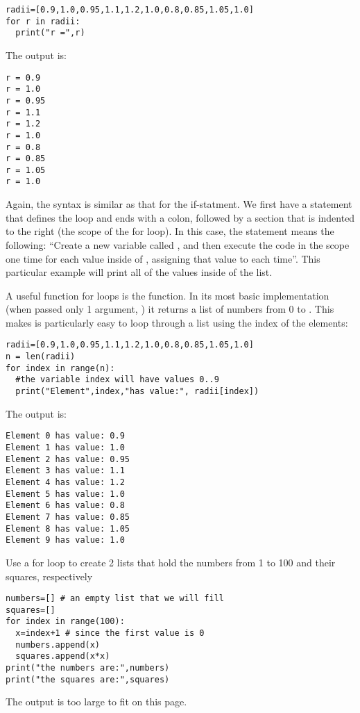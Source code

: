 \begin{lstlisting}[frame=single] 
radii=[0.9,1.0,0.95,1.1,1.2,1.0,0.8,0.85,1.05,1.0]
for r in radii:
  print("r =",r)
\end{lstlisting}
The output is:
\begin{verbatim}
r = 0.9
r = 1.0
r = 0.95
r = 1.1
r = 1.2
r = 1.0
r = 0.8
r = 0.85
r = 1.05
r = 1.0
\end{verbatim}

Again, the syntax is similar as that for the if-statment. We first have a statement that defines the loop and ends with a colon, followed by a section that is indented to the right (the scope of the for loop). In this case, the  statement means the following: ``Create a new variable called , and then execute the code in the scope one time for each value inside of , assigning that value to  each time''. This particular example will print all of the values inside of the list.

A useful function for loops is the  function. In its most basic implementation (when passed only 1 argument, ) it returns a list of numbers from 0 to . This makes is particularly easy to loop through a list using the index of the elements:

\begin{lstlisting}[frame=single] 
radii=[0.9,1.0,0.95,1.1,1.2,1.0,0.8,0.85,1.05,1.0]
n = len(radii)
for index in range(n):
  #the variable index will have values 0..9
  print("Element",index,"has value:", radii[index])
\end{lstlisting}
The output is:
\begin{verbatim}
Element 0 has value: 0.9
Element 1 has value: 1.0
Element 2 has value: 0.95
Element 3 has value: 1.1
Element 4 has value: 1.2
Element 5 has value: 1.0
Element 6 has value: 0.8
Element 7 has value: 0.85
Element 8 has value: 1.05
Element 9 has value: 1.0
\end{verbatim}

\begin{example}{0pt}{Use a for loop to create 2 lists that hold the numbers from 1 to 100 and their squares, respectively}{}
\begin{lstlisting}[frame=single] 
numbers=[] # an empty list that we will fill
squares=[]
for index in range(100):
  x=index+1 # since the first value is 0
  numbers.append(x)
  squares.append(x*x)
print("the numbers are:",numbers)
print("the squares are:",squares)
\end{lstlisting}
The output is too large to fit on this page.
\end{example}
